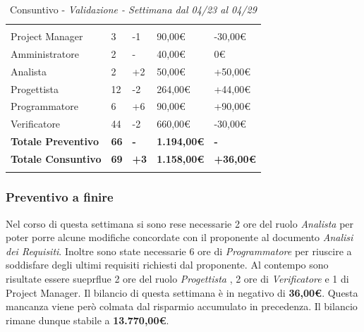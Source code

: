 \label{sec:tabellaConsuntivo1Sett}
\begin{table}[H]
	\centering
	\begin{tabular}{|p{3.8cm}|C{2.6cm}|C{2.9cm}|C{2.7cm}|C{3.3cm}|}
		
		 & & & & \\
		Project Manager & 3 & -1 & 90,00\euro & -30,00\euro \\
		\hline
		Amministratore & 2 & - & 40,00\euro & 0\euro \\
		\hline
		Analista      & 2 & +2 & 50,00\euro & +50,00\euro \\
		\hline
		Progettista   & 12 & -2 & 264,00\euro & +44,00\euro \\
		\hline
		Programmatore & 6 & +6 & 90,00\euro & +90,00\euro \\
		\hline
		Verificatore  & 44 & -2 & 660,00\euro & -30,00\euro \\
		\textbf{Totale Preventivo} & \textbf{66} & \textbf{-} & \textbf{1.194,00\euro} & \textbf{-}\\
		\textbf{Totale Consuntivo} & \textbf{69} & \textbf{+3} & \textbf{1.158,00\euro} & \textbf{+36,00\euro}\\
	\end{tabular}
	\caption{Consuntivo - \textit{Validazione - Settimana dal 04/23 al 04/29}}
	
\end{table}

\subsubsection{Preventivo a finire}
Nel corso di questa settimana si sono rese necessarie 2 ore del ruolo \textit{Analista} per poter porre alcune modifiche concordate con il proponente al documento \textit{Analisi dei Requisiti}. Inoltre sono state necessarie 6 ore di \textit{Programmatore} per riuscire a soddisfare degli ultimi requisiti richiesti dal proponente. Al contempo sono risultate essere sueprflue 2 ore del ruolo \textit{Progettista} , 2 ore di \textit{Verificatore} e 1 di {Project Manager}. Il bilancio di questa settimana è in negativo di \textbf{36,00\euro}. Questa mancanza viene però colmata dal risparmio accumulato in precedenza. Il bilancio rimane dunque stabile a \textbf{13.770,00\euro}.  






